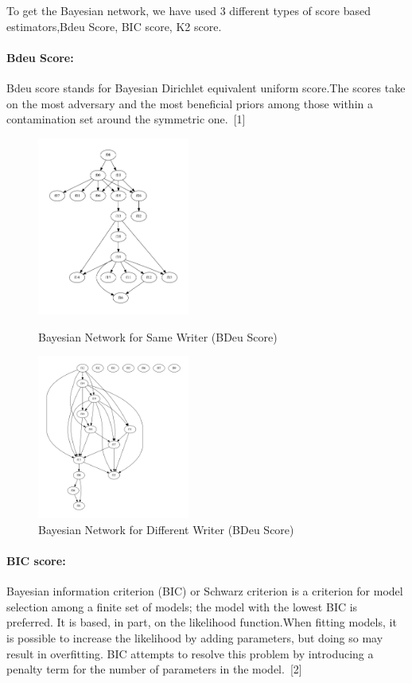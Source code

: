 \documentclass{article}
\begin{document}
    To get the Bayesian network, we have used 3 different types of score based estimators,Bdeu Score, BIC score, K2 score.
    
    \paragraph{Bdeu Score:}
    Bdeu score stands for Bayesian Dirichlet equivalent uniform score.The scores take on the most adversary and the most beneficial priors among those within a contamination set around the symmetric one.\ [1]
    \begin{figure}[h]
  \begin{minipage}{0.48\textwidth}
  \centering
  \includegraphics[width=50mm,scale=0.5]{bayesian_yes_Bdeu.jpg}
  \caption{Bayesian Network for Same Writer (BDeu Score)}
  \end{minipage}\hfill
  \begin{minipage}{0.48\textwidth}
  \centering
  \includegraphics[width=50mm,scale=0.5]{bayesian_no_BD.jpg}
  \caption{Bayesian Network for Different Writer (BDeu Score)}
  \end{minipage}
\end{figure}
    \paragraph{BIC score:}
    Bayesian information criterion (BIC) or Schwarz criterion is a criterion for model selection among a finite set of models; the model with the lowest BIC is preferred. It is based, in part, on the likelihood function.When fitting models, it is possible to increase the likelihood by adding parameters, but doing so may result in overfitting. BIC attempts to resolve this problem by introducing a penalty term for the number of parameters in the model.\ [2] 
    
\end{document}
